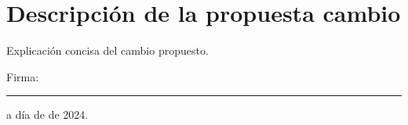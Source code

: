 \documentclass[titlepage,a4paper]{article}
\begin{document}
\section{Descripción de la propuesta cambio}
\normalsize
\begin{mdframed}[linewidth=1pt] %
    Explicación concisa del cambio propuesto.
    \vspace{5cm}
\end{mdframed}

\vspace{2cm} %
\noindent
Firma: \rule{5cm}{0.4pt} a día \underline{\hspace{1cm}} de \underline{\hspace{4cm}} de 2024. %
\end{document}
